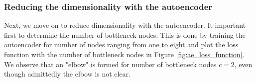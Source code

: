 \documentclass{article}
\begin{document}
%
%     
%       
%	
\subsubsection{Reducing the dimensionality with the autoencoder}
Next, we move on to reduce dimensionality with the autoencoder. It important first to determine the number of bottleneck nodes. This is done by training the autoencoder for number of nodes ranging from one to eight and plot the loss function with the number of bottleneck nodes in Figure \ref{fig:ae_loss_function}. We observe that an "elbow" \cite{elbow} is formed for number of bottleneck nodes $c=2$, even though admittedly the elbow is not clear.
\end{document}
